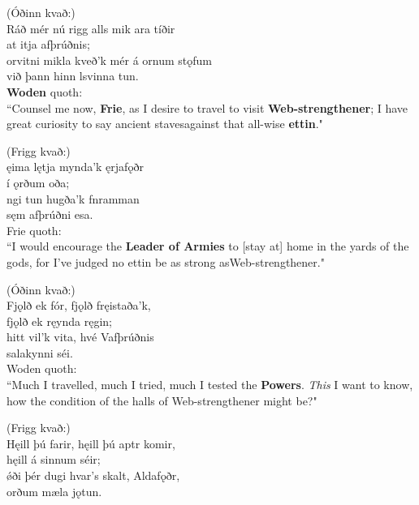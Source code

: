 \bookStart

(Óðinn kvað:) \\%
\bva Ráð mér nú rigg \hld alls mik ara tíðir \\%
at itja afþrúðnis; \\%
orvitni mikla \hld kveð'k mér á ornum stǫfum \\%
við þann hinn lsvinna tun.\\%

\bvb \textbf{Woden} quoth: \\ “Counsel me now, \textbf{Frie}, as I desire to travel to visit \textbf{Web-strengthener}; I have great curiosity to say ancient staves\footnotemark[1] against that all-wise \textbf{ettin}." \\

(Frigg kvað:) \\%
\bva {}ęima lętja \hld mynda'k ęrjafǫðr \\%
í ǫrðum oða; \\%
ngi tun \hld hugða'k fnramman \\%
sęm afþrúðni esa.\\%

\bvb Frie quoth: \\ “I would encourage the \textbf{Leader of Armies} to [stay at] home in the yards of the gods, for I've judged no ettin be as strong as\footnotemark[3] Web-strengthener." \\

(Óðinn kvað:) \\%
\bva Fjǫlð ek fór, \hld fjǫlð fręistaða'k, \\%
fjǫlð ek ręynda ręgin; \\%
hitt vil'k vita, \hld hvé Vafþrúðnis \\%
salakynni séi.\\%

\bvb Woden quoth: \\ “Much I travelled, much I tried, much I tested the \textbf{Powers}\footnotemark[4]. \emph{This} I want to know, how the condition of the halls of Web-strengthener might be?" \\

(Frigg kvað:) \\%
\bva Hęill þú farir, \hld hęill þú aptr komir, \\%
hęill á sinnum séir; \\%
ǿði þér dugi \hld hvar's skalt, Aldafǫðr, \\%
orðum mæla jǫtun.\\%

